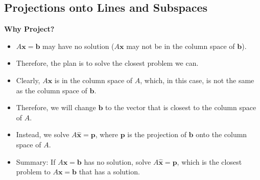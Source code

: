\documentclass[11pt]{article}
\begin{document}
\subsection{Projections onto Lines and Subspaces}

\textbf{Why Project?}
\begin{itemize}
    \item $A\boldsymbol{x}=\boldsymbol{b}$ may have no solution ($A \boldsymbol{x}$ may not be 
    in the column space of $\boldsymbol{b}$).
    \item Therefore, the plan is to solve the closest problem we can.
    \item Clearly, $A\boldsymbol{x}$ is in the column space of $A$, which, in this case, is not
    the same as the column space of $\boldsymbol{b}$.
    \item Therefore, we will change $\boldsymbol{b}$ to the vector that is closest to the 
    column space of $A$.
    \item Instead, we solve $A\boldsymbol{\hat{x}}=\boldsymbol{p}$, where $\boldsymbol{p}$ is 
    the projection of $\boldsymbol{b}$ onto the column space of $A$.
    \item Summary: If $A\boldsymbol{x}=\boldsymbol{b}$ has no solution, solve $A\boldsymbol{
    \hat{x}}=\boldsymbol{p}$, which is the closest problem to $A\boldsymbol{x}=\boldsymbol{b}$ 
    that has a solution.
\end{itemize} 
\end{document}
